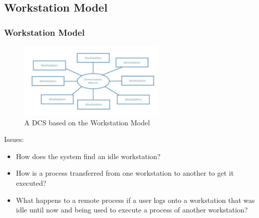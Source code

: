 \documentclass{beamer}
\begin{document}
\subsection{Workstation Model}
\begin{frame}
    \frametitle{Workstation Model}
\begin{figure}
  \centering
  \includegraphics[width=7cm]{workStationModel}
  \caption{A DCS based on the Workstation Model}\label{workstationmodel}
\end{figure}

    Issues:
    \begin{itemize}
      \item {How does the system find an idle workstation?}
      \item {How is a process transferred from one workstation to another to get it executed?}
      \item {What happens to a remote process if a user logs onto a workstation that was idle until now and being used to execute a process of another workstation?}
    \end{itemize}
\end{frame}
\end{document}

